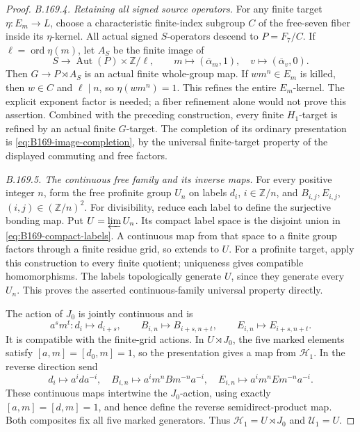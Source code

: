 \begin{proof}
\emph{B.169.4. Retaining all signed source operators.}
For any finite target \(\eta:E_m\to L\), choose a characteristic
finite-index subgroup \(C\) of the free-seven fiber inside its
\(\eta\)-kernel. All actual signed \(S\)-operators descend to \(P=F_7/C\).
If \(\ell=\operatorname{ord}\eta(m)\), let \(A_S\) be the finite image of
\[
 S\longrightarrow\operatorname{Aut}(P)\times\mathbb Z/\ell,\qquad
 m\longmapsto(\overline\alpha_m,1),\quad
 v\longmapsto(\overline\alpha_v,0).
\]
Then \(G\to P\rtimes A_S\) is an actual finite whole-group map.
If \(w m^n\in E_m\) is killed, then \(w\in C\) and \(\ell\mid n\),
so \(\eta(wm^n)=1\). This refines the entire \(E_m\)-kernel.
The explicit exponent factor is needed; a fiber refinement alone would
not prove this assertion. Combined with the preceding construction,
every finite \(H_1\)-target is refined by an actual finite \(G\)-target.
The completion of its ordinary presentation is
\eqref{eq:B169-image-completion}, by the universal finite-target property
of the displayed commuting and free factors.

\emph{B.169.5. The continuous free family and its inverse maps.}
For every positive integer \(n\), form the free profinite group \(U_n\)
on labels \(d_i\), \(i\in\mathbb Z/n\), and
\(B_{i,j},E_{i,j}\), \((i,j)\in(\mathbb Z/n)^2\).
For divisibility, reduce each label to define the surjective bonding map.
Put \(U=\varprojlim U_n\). Its compact label space is the disjoint union
in \eqref{eq:B169-compact-labels}. A continuous map from that space to a
finite group factors through a finite residue grid, so extends to \(U\).
For a profinite target, apply this construction to every finite quotient;
uniqueness gives compatible homomorphisms. The labels topologically
generate \(U\), since they generate every \(U_n\).
This proves the asserted continuous-family universal property directly.

The action of \(J_0\) is jointly continuous and is
\[
 a^s m^t:d_i\mapsto d_{i+s},\qquad
 B_{i,n}\mapsto B_{i+s,n+t},\qquad
 E_{i,n}\mapsto E_{i+s,n+t}.
\]
It is compatible with the finite-grid actions. In \(U\rtimes J_0\),
the five marked elements satisfy \([a,m]=[d_0,m]=1\), so the presentation
gives a map from \(\mathcal H_1\). In the reverse direction send
\[
 d_i\mapsto a^ida^{-i},\quad
 B_{i,n}\mapsto a^im^nBm^{-n}a^{-i},\quad
 E_{i,n}\mapsto a^im^nEm^{-n}a^{-i}.
\]
These continuous maps intertwine the \(J_0\)-action, using exactly
\([a,m]=[d,m]=1\), and hence define the reverse semidirect-product map.
Both composites fix all five marked generators. Thus
\(\mathcal H_1=U\rtimes J_0\) and \(\mathcal U_1=U\).


\end{proof}

